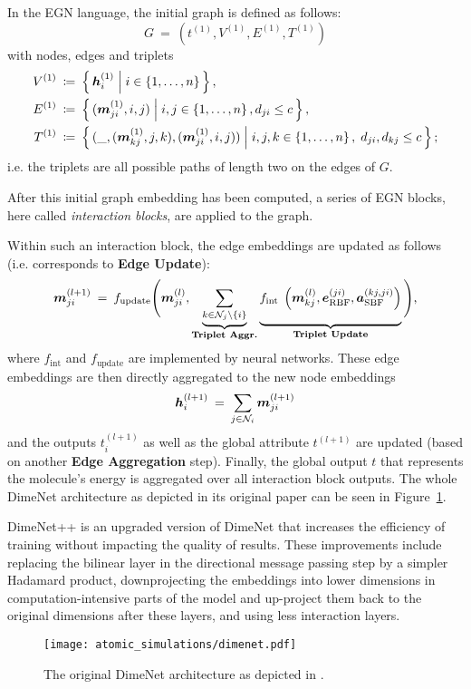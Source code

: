 In the EGN language, the initial graph is defined as follows:
\[
    G \: = \: (t^{(1)}, V^{(1)}, E^{(1)}, T^{(1)})
\]
with nodes, edges and triplets
\begin{align*}
    V^{(1)} \: &\coloneqq \: \left\{\, \boldsymbol{h}_i^{(1)} \; \middle| \; i \in \left\{1, \dots, n\right\} \,\right\}, \\
    E^{(1)} \: &\coloneqq \: \left\{\, (\boldsymbol{m}_{ji}^{(1)}, i, j) \; \middle| \; i, j \in \left\{1, \dots, n\right\}, d_{ji} \leq c \,\right\}, \\
    T^{(1)} \: &\coloneqq \: \left\{\, (\_,(\boldsymbol{m}_{kj}^{(1)}, j, k), (\boldsymbol{m}_{ji}^{(1)}, i, j)) \; \middle| \; i, j, k \in \left\{1, \dots, n\right\}, \; d_{ji}, d_{kj} \leq c \,\right\} \text{;}
\end{align*}
i.e. the triplets are all possible paths of length two on the edges of $G$.

After this initial graph embedding has been computed, a series of EGN blocks,
here called \textit{interaction blocks}, are applied to the graph.

Within such an interaction block, the edge embeddings 
are updated as follows (i.e. corresponds to \textbf{Edge Update}):
\[
    \mm_{ji}^{(l+1)} \: = \: 
    f_{\text{update}}\Bigg(\mm_{ji}^{(l)}, 
    \underbrace{\sum_{k \in \mathcal{N}_{j} \backslash\{i\}}}_{\textbf{Triplet Aggr.}} 
    \underbrace{ \vphantom{\sum_{\mathcal{N}_j}} 
    f_{\text {int }}\left(\mm_{k j}^{(l)}, \ee_{\text{RBF}}^{(ji)}, 
    \aaa_{\text{SBF}}^{(kj, ji)}\right)}
    _{\textbf{Triplet Update}}\Bigg) \text{,}
\]
where $f_{\text{int}}$ and $f_{\text{update}}$ are implemented by neural networks.
These edge embeddings are then directly aggregated to the new node embeddings
\[
    \boldsymbol{h}_i^{(l+1)} \: = \: \sum_{j \in \mathcal{N}_i} \boldsymbol{m}_{ji}^{(l+1)}
\]
and the outputs $t^{(l+1)}_i$ as well as the global attribute $t^{(l+1)}$ are
updated (based on another \textbf{Edge Aggregation} step).
Finally, the global output $t$ that represents the molecule's energy is 
aggregated over all interaction block outputs.
The whole DimeNet architecture as depicted in its original paper 
\cite{DBLP:journals/corr/abs-2003-03123} can be seen in Figure~\ref{fig:dimenet}.

DimeNet++ \cite{https://doi.org/10.48550/arxiv.2011.14115} is an upgraded version of 
DimeNet that increases the efficiency of training without impacting the quality of results. 
These improvements include replacing the bilinear layer in the directional message passing 
step by a simpler Hadamard product, downprojecting the embeddings into lower dimensions in
computation-intensive parts of the model and up-project them back to the original dimensions 
after these layers, and using less interaction layers.

\begin{figure}[H]
    \centering
    \texttt{[image: atomic\_simulations/dimenet.pdf]}
    \caption{The original DimeNet architecture as depicted in \cite*{DBLP:journals/corr/abs-2003-03123}.}
    \label{fig:dimenet}
\end{figure}
